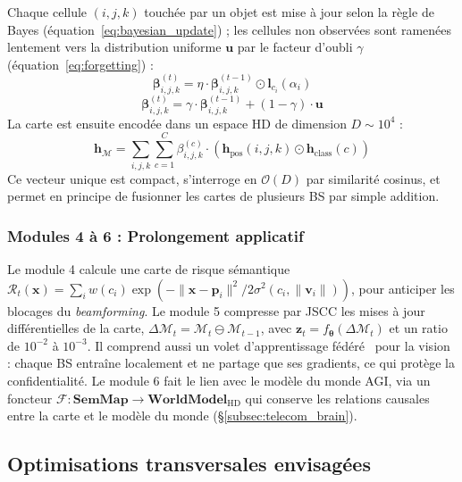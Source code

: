 \documentclass[12pt,a4paper,titlepage]{article}
\begin{document}
Chaque cellule $(i,j,k)$ touchée par un objet est mise à jour selon la règle de Bayes (équation~\eqref{eq:bayesian_update}) ; les cellules non observées sont ramenées lentement vers la distribution uniforme $\mathbf{u}$ par le facteur d'oubli $\gamma$ (équation~\eqref{eq:forgetting}) :
\begin{equation}
    \boldsymbol{\beta}_{i,j,k}^{(t)} = \eta \cdot \boldsymbol{\beta}_{i,j,k}^{(t-1)} \odot \mathbf{l}_{c_i}(\alpha_i)
    \label{eq:bayesian_update}
\end{equation}
\begin{equation}
    \boldsymbol{\beta}_{i,j,k}^{(t)} = \gamma \cdot \boldsymbol{\beta}_{i,j,k}^{(t-1)} + (1-\gamma) \cdot \mathbf{u}
    \label{eq:forgetting}
\end{equation}
La carte est ensuite encodée dans un espace HD de dimension $D\sim10^4$ :
\begin{equation}
    \mathbf{h}_{\mathcal{M}} = \sum_{i,j,k} \sum_{c=1}^{C} \beta_{i,j,k}^{(c)} \cdot \left( \mathbf{h}_{\text{pos}}(i,j,k) \odot \mathbf{h}_{\text{class}}(c) \right)
    \label{eq:hd_encoding}
\end{equation}
Ce vecteur unique est compact, s'interroge en $\mathcal{O}(D)$ par similarité cosinus, et permet en principe de fusionner les cartes de plusieurs BS par simple addition.

\subsubsection{Modules 4 à 6 : Prolongement applicatif}

Le module 4 calcule une carte de risque sémantique $\mathcal{R}_t(\mathbf{x}) = \sum_i w(c_i)\exp(-\|\mathbf{x}-\mathbf{p}_i\|^2 / 2\sigma^2(c_i,\|\mathbf{v}_i\|))$, pour anticiper les blocages du \textit{beamforming}. Le module 5 compresse par JSCC les mises à jour différentielles de la carte, $\Delta\mathcal{M}_t = \mathcal{M}_t \ominus \mathcal{M}_{t-1}$, avec $\mathbf{z}_t = f_{\boldsymbol{\theta}}(\Delta\mathcal{M}_t)$ et un ratio de $10^{-2}$ à $10^{-3}$. Il comprend aussi un volet d'apprentissage fédéré~\cite{federated_learning} pour la vision : chaque BS entraîne localement et ne partage que ses gradients, ce qui protège la confidentialité. Le module 6 fait le lien avec le modèle du monde AGI, via un foncteur $\mathcal{F}: \mathbf{SemMap} \to \mathbf{WorldModel}_{\text{HD}}$ qui conserve les relations causales entre la carte et le modèle du monde (\S\ref{subsec:telecom_brain}).

\subsection{Optimisations transversales envisagées}
\end{document}
